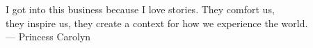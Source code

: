 \cleardoublepage
\thispagestyle{empty}


\vspace*{3cm}

\begin{raggedleft}
    I got into this business because I love stories. They comfort us, \\ they inspire us, they create a context for how we experience the world. \\
	--- Princess Carolyn\\
\end{raggedleft}

\vspace{4cm}



